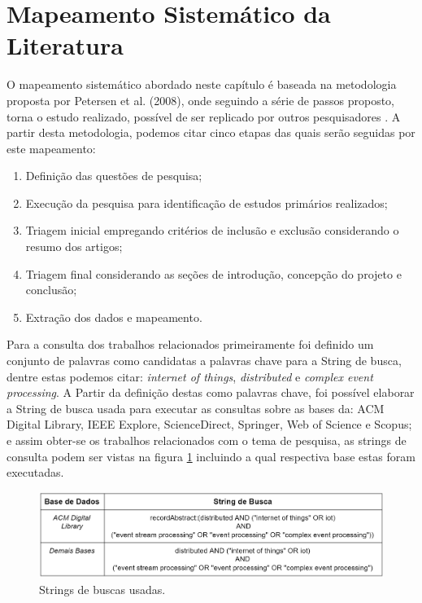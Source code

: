 \documentclass[tid,table]{texufpel} %
\begin{document}
\section{Mapeamento Sistemático da Literatura}

O mapeamento sistemático abordado neste capítulo é baseada na metodologia proposta por Petersen et al. (2008), onde seguindo a série de passos proposto, torna o estudo realizado, possível de ser replicado por outros pesquisadores \cite{petersen08}. A partir desta metodologia, podemos citar cinco etapas das quais serão seguidas por este mapeamento:

\begin{enumerate}
	\item Definição das questões de pesquisa;
	\item Execução da pesquisa para identificação de estudos primários realizados;
	\item Triagem inicial empregando critérios de inclusão e exclusão considerando o resumo dos artigos;
	\item Triagem final considerando as seções de introdução, concepção do projeto e conclusão;
	\item Extração dos dados e mapeamento.
	

\end{enumerate}  

Para a consulta dos trabalhos relacionados primeiramente foi definido um conjunto de palavras como candidatas a palavras chave para a String de busca, dentre estas podemos citar: \textit{internet of things}, \textit{distributed} e \textit{complex event processing}. A Partir da definição destas como palavras chave, foi possível elaborar a String de busca usada para executar as consultas sobre as bases da: ACM Digital Library, IEEE Explore, ScienceDirect, Springer, Web of Science e Scopus; e assim obter-se os trabalhos relacionados com o tema de pesquisa, as strings de consulta podem ser vistas na figura \ref{tab:stringBusca} incluindo a qual respectiva base estas foram executadas.



\begin{figure}[ht]
	\centering
	\includegraphics[width=1\textwidth]{imagens/tabela_string_busca.png}
	\caption{Strings de buscas usadas.}
	\label{tab:stringBusca}
\end{figure}
\end{document}
